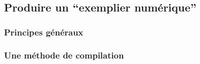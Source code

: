 



% 

\subsection{Produire un \enquote{exemplier numérique}}

\subsubsection{Principes généraux}




\subsubsection{Une méthode de compilation}


